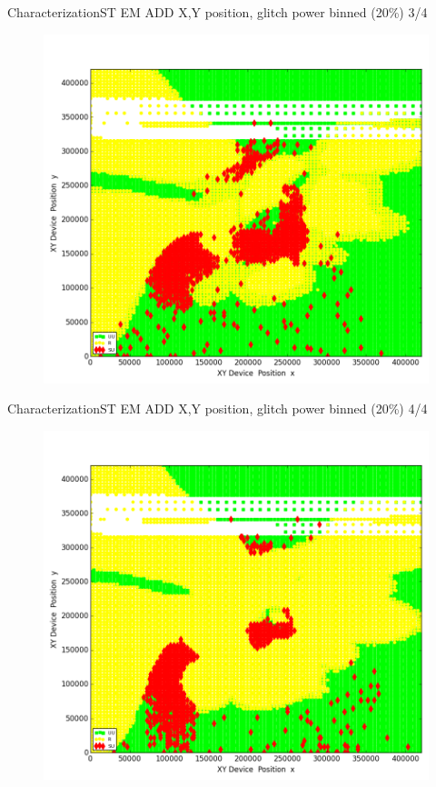 \documentclass[table]{beamer}
\begin{document}
\begin{frame}{Characterization}{ST EM ADD X,Y position, glitch power binned (20\%) 3/4}
    \vspace{-.3cm}
    \begin{figure}[H]
      \centering
      \includegraphics[width=.75\textwidth]{../../plots/newplots/st-add-x-y-power-3.png}
    \end{figure}
\end{frame}
\begin{frame}{Characterization}{ST EM ADD X,Y position, glitch power binned (20\%) 4/4}
    \vspace{-.3cm}
    \begin{figure}[H]
      \centering
      \includegraphics[width=.75\textwidth]{../../plots/newplots/st-add-x-y-power-4.png}
    \end{figure}
\end{frame}
\end{document}
